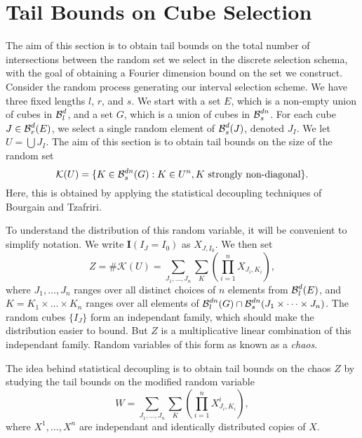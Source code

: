 \section{Tail Bounds on Cube Selection}

The aim of this section is to obtain tail bounds on the total number of intersections between the random set we select in the discrete selection schema, with the goal of obtaining a Fourier dimension bound on the set we construct. Consider the random process generating our interval selection scheme. We have three fixed lengths $l$, $r$, and $s$. We start with a set $E$, which is a non-empty union of cubes in $\operatorname{\mathcal{B}}^d_l$, and a set $G$, which is a union of cubes in $\operatorname{\mathcal{B}}^{dn}_s$. For each cube $J \in \operatorname{\mathcal{B}}^d_r(E)$, we select a single random element of $\operatorname{\mathcal{B}}^d_s(J)$, denoted $J_I$. We let $U = \bigcup J_I$. The aim of this section is to obtain tail bounds on the size of the random set
%
\[ \mathcal{K}(U) = \{ K \in \operatorname{\mathcal{B}}^{dn}_s(G): K \in U^n, K\ \text{strongly non-diagonal} \}. \]
%
Here, this is obtained by applying the statistical decoupling techniques of Bourgain and Tzafriri.

To understand the distribution of this random variable, it will be convenient to simplify notation. We write $\mathbf{I}(I_J = I_0)$ as $X_{J,I_0}$. We then set
%
\[ Z = \# \mathcal{K}(U) = \sum_{J_1, \dots, J_n} \sum_K \left( \prod_{i = 1}^n X_{J_i,K_i} \right), \]
%
where $J_1, \dots, J_n$ ranges over all distinct choices of $n$ elements from $\operatorname{\mathcal{B}}^d_l(E)$, and $K = K_1 \times \dots \times K_n$ ranges over all elements of $\operatorname{\mathcal{B}}^{dn}_l(G) \cap \operatorname{\mathcal{B}}^{dn}_s(J_1 \times \dots \times J_n)$. The random cubes $\{ I_J \}$ form an independant family, which should make the distribution easier to bound. But $Z$ is a multiplicative linear combination of this independant family. Random variables of this form as known as a \emph{chaos}.

The idea behind statistical decoupling is to obtain tail bounds on the chaos $Z$ by studying the tail bounds on the modified random variable
%
\[ W = \sum_{J_1, \dots, J_n} \sum_K \left( \prod_{i = 1}^n X_{J_i,K_i}^i \right), \]
%
where $X^1, \dots, X^n$ are independant and identically distributed copies of $X$.

